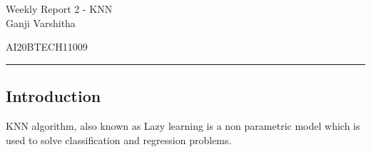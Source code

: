\documentclass[12pt,letterpaper, onecolumn]{exam}
\begin{document}
\newtheorem{theorem}{Theorem}[section]
\newtheorem{problem}{Problem}
\newtheorem{proposition}{Proposition}[section]
\newtheorem{lemma}{Lemma}[section]
\newtheorem{corollary}[theorem]{Corollary}
\newtheorem{example}{Example}[section]
\newtheorem{definition}[problem]{Definition}

\newcommand{\BEQA}{\begin{eqnarray}}
\newcommand{\EEQA}{\end{eqnarray}}
\newcommand{\define}{\stackrel{\triangle}{=}}

\raggedbottom
\setlength{\parindent}{0pt}
\providecommand{\mbf}{\mathbf}
\providecommand{\norm}[1]{\lVert#1\rVert}
\providecommand{\pr}[1]{\ensuremath{\Pr\left(#1\right)}}
\providecommand{\qfunc}[1]{\ensuremath{Q\left(#1\right)}}
\providecommand{\sbrak}[1]{\ensuremath{{}\left[#1\right]}}
\providecommand{\lsbrak}[1]{\ensuremath{{}\left[#1\right.}}
\providecommand{\rsbrak}[1]{\ensuremath{{}\left.#1\right]}}
\providecommand{\brak}[1]{\ensuremath{\left(#1\right)}}
\providecommand{\lbrak}[1]{\ensuremath{\left(#1\right.}}
\providecommand{\rbrak}[1]{\ensuremath{\left.#1\right)}}
\providecommand{\cbrak}[1]{\ensuremath{\left\{#1\right\}}}
\providecommand{\lcbrak}[1]{\ensuremath{\left\{#1\right.}}
\providecommand{\rcbrak}[1]{\ensuremath{\left.#1\right\}}}
\let\vec\mathbf




\begingroup  
    \centering
    
    \LARGE Weekly Report 2 - KNN\\[0.5em]
    
    \large Ganji Varshitha\par
    \large AI20BTECH11009\par
\endgroup
\rule{\textwidth}{0.4pt}
\pointsdroppedatright   %
\printanswers
\newcommand\Solution{
  \textbf{Solution:}\\}
\newcommand{\myvec}[1]{\ensuremath{\begin{bmatrix}#1\end{bmatrix}}}

 \subsection*{Introduction}
KNN algorithm, also known as Lazy learning is a non parametric model which is used to solve classification and regression problems. 
\end{document}
